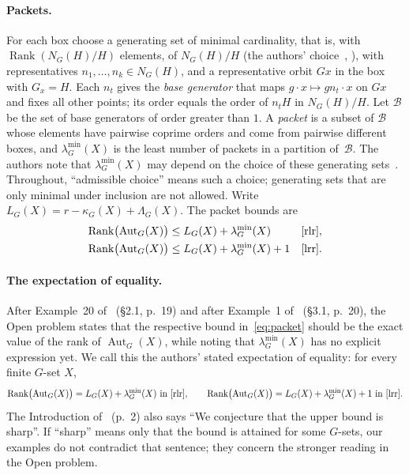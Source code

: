 \documentclass[11pt]{article}
\theoremstyle{remark}
\newcommand{\Rank}{\operatorname{Rank}}
\newcommand{\Aut}{\operatorname{Aut}}
\newcommand{\lmin}{\lambda^{\min}}
\begin{document}
\paragraph{Packets.} For each box choose a generating set of minimal
cardinality, that is, with $\Rank(N_G(H)/H)$ elements, of $N_G(H)/H$ (the
authors' choice~\cite[p.~8]{lrr}, \cite[p.~8]{rlr}), with representatives
$n_1,\dots,n_k\in N_G(H)$, and a
representative orbit $Gx$ in the box with $G_x=H$. Each $n_t$ gives the
\emph{base generator} that maps $g\cdot x\mapsto gn_t\cdot x$ on $Gx$ and
fixes all other points; its order equals the order of $n_tH$ in $N_G(H)/H$.
Let $\mathcal B$ be the set of base generators of order greater than $1$. A
\emph{packet} is a subset of $\mathcal B$ whose elements have pairwise coprime
orders and come from pairwise different boxes, and $\lmin_G(X)$ is the least
number of packets in a partition of~$\mathcal B$. The authors note that
$\lmin_G(X)$ may depend on the choice of these generating
sets~\cite[p.~19]{lrr}. Throughout, ``admissible choice'' means such a choice;
generating sets that are only minimal under inclusion are not allowed. Write $L_G(X)=r-\kappa_G(X)+\Lambda_G(X)$. The packet
bounds are
\begin{equation}\label{eq:packet}
\begin{aligned}
\Rank\bigl(\Aut_G(X)\bigr)&\le L_G(X)+\lmin_G(X)&&\text{\cite[Corollary~19]{rlr}},\\
\Rank\bigl(\Aut_G(X)\bigr)&\le L_G(X)+\lmin_G(X)+1&&\text{\cite[Corollary~6]{lrr}}.
\end{aligned}
\end{equation}

\paragraph{The expectation of equality.} After Example~20 of~\cite{rlr}
(\S2.1, p.~19) and after Example~1 of~\cite{lrr} (\S3.1, p.~20), the Open
problem states that the respective bound in~\eqref{eq:packet} should be the
exact value of the rank of $\Aut_G(X)$, while noting that $\lmin_G(X)$ has no
explicit expression yet. We call this the authors' stated expectation of
equality: for every finite $G$-set $X$,
\[
\Rank\bigl(\Aut_G(X)\bigr)=L_G(X)+\lmin_G(X)\ \text{in \cite{rlr}},\qquad
\Rank\bigl(\Aut_G(X)\bigr)=L_G(X)+\lmin_G(X)+1\ \text{in \cite{lrr}}.
\]
The Introduction of~\cite{lrr} (p.~2) also says ``We conjecture that the upper
bound is sharp''. If ``sharp'' means only that the bound is attained for some
$G$-sets, our examples do not contradict that sentence; they concern the
stronger reading in the Open problem.
\end{document}
